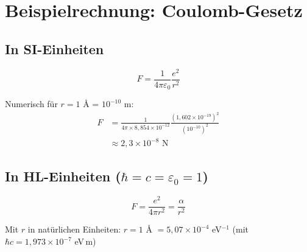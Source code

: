 	\begin{table}[h]
		\centering
		\caption{Umrechnungstabelle SI zu HL}
	\end{table}
	
	\section{Beispielrechnung: Coulomb-Gesetz}
	
	\subsection{In SI-Einheiten}
	
	\begin{equation}
		F = \frac{1}{4\pi\varepsilon_0} \frac{e^2}{r^2}
	\end{equation}
	
	Numerisch für $r = 1$ Å = $10^{-10}$ m:
	\begin{align}
		F &= \frac{1}{4\pi \times 8{,}854 \times 10^{-12}} \frac{(1{,}602 \times 10^{-19})^2}{(10^{-10})^2} \\
		&\approx 2{,}3 \times 10^{-8} \text{ N}
	\end{align}
	
	\subsection{In HL-Einheiten ($\hbar = c = \varepsilon_0 = 1$)}
	
	\begin{equation}
		F = \frac{e^2}{4\pi r^2} = \frac{\alpha}{r^2}
	\end{equation}
	
	Mit $r$ in natürlichen Einheiten: $r = 1$ Å $= 5{,}07 \times 10^{-4}$ eV$^{-1}$ (mit $\hbar c = 1{,}973 \times 10^{-7}$ eV\,m)
	
